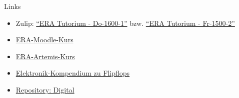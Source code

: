 \begin{frame}[c, fragile]{Links}{}
	\begin{itemize}
		\item Zulip: \href{https://zulip.in.tum.de/#narrow/stream/2661-ERA-Tutorium---Do-1600-1}{\enquote{ERA Tutorium - Do-1600-1}}
		      bzw. \href{https://zulip.in.tum.de/#narrow/stream/2675-ERA-Tutorium---Fr-1500-2 }{\enquote{ERA Tutorium - Fr-1500-2}}
		\item \href{https://www.moodle.tum.de/course/view.php?id=100633}{ERA-Moodle-Kurs}
		\item \href{https://artemis.in.tum.de/courses/401}{ERA-Artemis-Kurs}
		\item \href{https://www.elektronik-kompendium.de/sites/dig/0209301.htm}{Elektronik-Kompendium zu Flipflops}
		\item \href{https://github.com/hneemann/Digital}{Repository: Digital}
	\end{itemize}
\end{frame}

\maketitle



